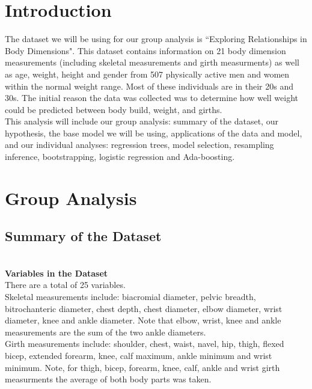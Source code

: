 \documentclass[11pt]{article}\usepackage[]{graphicx}\usepackage[]{color}
\begin{document}
\section{Introduction} %

The dataset we will be using for our group analysis is ``Exploring Relationships in Body Dimensions". This dataset contains information on 21 body dimension measurements (including skeletal measurements and girth measurments) as well as age, weight, height and gender from 507 physically active men and women within the normal weight range. Most of these individuals are in their 20s and 30s. The initial reason the data was collected was to determine how well weight could be predicted between body build, weight, and girths. \\ 

This analysis will include our group analysis: summary of the dataset, our hypothesis, the base model we will be using, applications of the data and model, and our individual analyses: regression trees, model selection, resampling inference, bootstrapping, logistic regression and Ada-boosting.

\section{Group Analysis} 






\subsection{Summary of the Dataset}

\\

\textbf{Variables in the Dataset}\\ %

There are a total of 25 variables.\\

Skeletal measurements include: biacromial diameter, pelvic breadth, bitrochanteric diameter, chest depth, chest diameter, elbow diameter, wrist diameter, knee and ankle diameter. Note that elbow, wrist, knee and ankle measurements are the sum of the two ankle diameters.\\

Girth measurements include: shoulder, chest, waist, navel, hip, thigh, flexed bicep, extended forearm, knee, calf maximum, ankle minimum and wrist minimum. Note, for thigh, bicep, forearm, knee, calf, ankle and wrist girth measurments the average of both body parts was taken.\\
\end{document}
